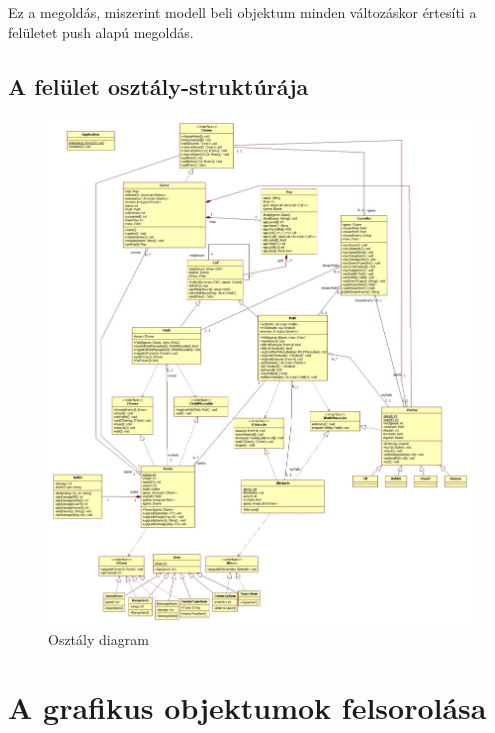 Ez a megoldás, miszerint modell beli objektum minden változáskor értesíti a felületet push alapú megoldás.



\subsection{A felület osztály-struktúrája}

\begin{figure}[H]
\begin{center}
\includegraphics[width=17cm]{chapters/chapter11/images/SimaClassDiag.jpg}
\caption{Osztály diagram}
\label{fig:Osztaly_diagram}
\end{center}
\end{figure}


\section{A grafikus objektumok felsorolása}

